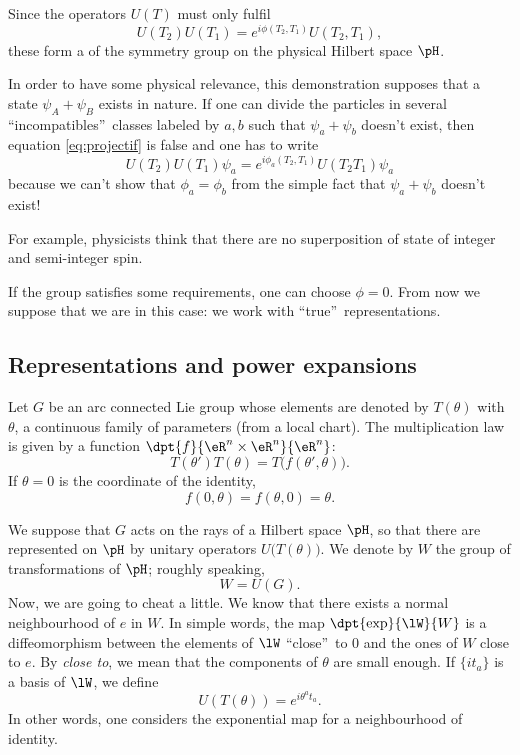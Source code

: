 Since the operators $U(T)$ must only fulfil
\begin{equation}\label{eq:projectif}
	U(T_2)U(T_1)=e^{i\phi(T_2,T_1)}U(T_2,T_1),
\end{equation}
these form a  of the symmetry group on the physical Hilbert space $\pH$.

\begin{remark}
	In order to have some physical relevance, this demonstration supposes that a state $\psi_A+\psi_B$ exists in nature. If one can divide the particles in several ``incompatibles''\ classes labeled by $a,b$ such that $\psi_a+\psi_b$ doesn't exist, then equation \eqref{eq:projectif} is false and one has to write
	\[
		U(T_2)U(T_1)\psi_a=e^{i\phi_a(T_2,T_1)}U(T_2T_1)\psi_a
	\]
	because we can't show that $\phi_a=\phi_b$ from the simple fact that $\psi_a+\psi_b$ doesn't exist!

	For example, physicists think that there are no superposition of state of integer and semi-integer spin.
\end{remark}

\begin{remark}
	If the group satisfies some requirements, one can choose $\phi=0$. From now we suppose that we are in this case: we work with ``true''\ representations.
\end{remark}


\subsection{Representations and power expansions}

Let $G$ be an arc connected Lie group whose elements are denoted by $T(\theta)$ with $\theta$, a continuous family of parameters (from a local chart). The multiplication law is given by a function $\dpt{f}{\eR^n\times\eR^n}{\eR^n}$:
\begin{equation}\label{eq:T_groupe}
	T(\theta')T(\theta)=T\big(f(\theta',\theta)\big).
\end{equation}
If $ \theta=0$ is the coordinate of the identity,
\begin{equation}\label{eq:f_0}
	f(0,\theta)=f(\theta,0)=\theta.
\end{equation}

We suppose that $G$ acts on the rays of a Hilbert space $\pH$, so that there are represented on $\pH$ by unitary operators $U\big(T(\theta)\big)$. We denote by $W$ the group of transformations of $\pH$; roughly speaking,
\[
	W=U(G).
\]
Now, we are going to cheat a little. We know that there exists a normal neighbourhood of $e$ in $W$. In simple words, the map $\dpt{\exp}{\lW}{W}$ is a diffeomorphism between the elements of $\lW$ ``close''\ to $0$ and the ones of $W$ close to $e$. By \textit{close to}, we mean that the components of $\theta$ are small enough. If $\{it_a\}$ is a basis of $\lW$, we define
\begin{equation}\label{eq:U_expo}
	U(T(\theta))=e^{i\theta^at_a}.
\end{equation}
In other words, one considers the exponential map for a neighbourhood of identity.

